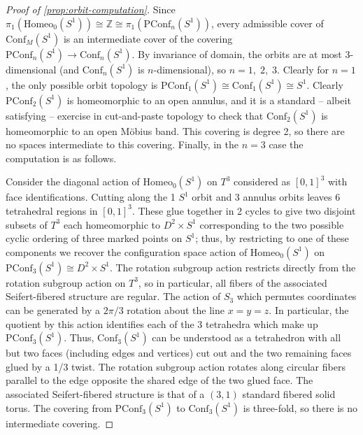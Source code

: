 \documentclass[10pt, oneside]{article}
\newcommand{\Z}{\mathbb{Z}}
\newcommand{\homeo}[1][S^1]{\text{Homeo}_0(#1)}
\newcommand{\conf}[2][S^1]{\text{Conf}_{#2}(#1)}
\newcommand{\pconf}[2][S^1]{\text{PConf}_{#2}(#1)}
\theoremstyle{definition}
\theoremstyle{definition}
\begin{document}
\begin{proof}[Proof of \cref{prop:orbit-computation}]
    Since $\pi_1(\homeo) \cong \Z \cong \pi_1(\pconf[S^1]{n})$, every admissible cover of $\conf[S^1]{M}$ is an intermediate cover of the covering $\pconf[S^1]{n}\to \conf[S^1]{n}$. By invariance of domain, the orbits are at most 3-dimensional (and $\conf[S^1]{n}$ is $n$-dimensional), so $n=1,\; 2,\; 3$. Clearly for $n=1$, the only possible orbit topology is $\pconf[S^1]{1} \cong \conf[S^1]{1}\cong S^1$. Clearly $\pconf[S^1]{2}$ is homeomorphic to an open annulus, and it is a standard -- albeit satisfying -- exercise in cut-and-paste topology to check that $\conf[S^1]{2}$ is homeomorphic to an open M\"{o}bius band. This covering is degree 2, so there are no spaces intermediate to this covering. Finally, in the $n=3$ case the computation is as follows.

     Consider the diagonal action of $\homeo$ on $T^3$ considered as $[0,1]^3$ with face identifications. Cutting along the 1 $S^1$ orbit and 3 annulus orbits leaves 6 tetrahedral regions in $[0,1]^3$. These glue together in 2 cycles to give two disjoint subsets of $T^3$ each homeomorphic to $D^2 \times S^1$ corresponding to the two possible cyclic ordering of three marked points on $S^1$; thus, by restricting to one of these components we recover the configuration space action of $\homeo$ on $\pconf[S^1]{3}\cong D^2 \times S^1$. The rotation subgroup action restricts directly from the rotation subgroup action on $T^3$, so in particular, all fibers of the associated Seifert-fibered structure are regular. The action of $S_3$ which permutes coordinates can be generated by a $2\pi/3$ rotation about the line $x=y=z$.  In particular, the quotient by this action identifies each of the 3 tetrahedra which make up $\pconf[S^1]{3}$. Thus, $\conf[S^1]{3}$ can be understood as a tetrahedron with all but two faces (including edges and vertices) cut out and the two remaining faces glued by a 1/3 twist. The rotation subgroup action rotates along circular fibers parallel to the edge opposite the shared edge of the two glued face. The associated  Seifert-fibered structure is that of a $(3, 1)$ standard fibered solid torus. The covering from $\pconf[S^1]{3}$ to $\conf[S^1]{3}$ is three-fold, so there is no intermediate covering.
\end{proof}
\end{document}
